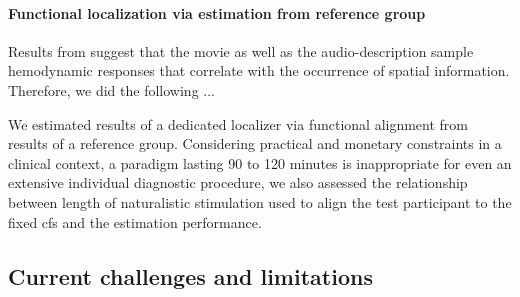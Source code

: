 \paragraph{Functional localization via estimation from reference group}


%
Results from \citet{haeusler2022processing} suggest that the movie as well as
the audio-description sample hemodynamic responses that correlate with the
occurrence of spatial information.
%
Therefore, we did the following ...

We estimated results of a dedicated localizer \citep{sengupta2016extension} via
functional alignment from results of a reference group.
Considering practical and monetary constraints in a clinical context, a paradigm
lasting 90 to 120 minutes is inappropriate for even an extensive individual
diagnostic procedure, we also assessed the relationship between length of
naturalistic stimulation used to align the test participant to the fixed
\ac{cfs} and the estimation performance.



\subsection{Current challenges and limitations}


